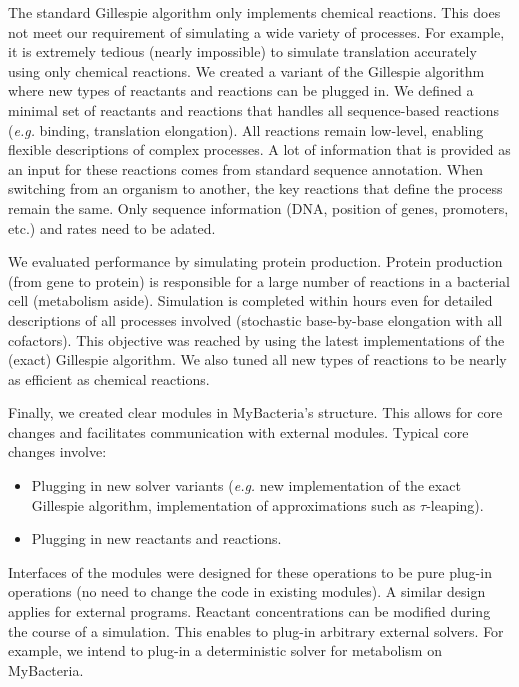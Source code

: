 The standard Gillespie algorithm only implements chemical reactions.
This does not meet our requirement of simulating a wide variety of processes.
For example, it is extremely tedious (nearly impossible) to simulate
translation accurately using only chemical reactions.
We created a variant of the Gillespie algorithm where new types of reactants
and reactions can be plugged in.
We defined a minimal set of reactants and reactions that handles all
sequence-based reactions (\textit{e.g.} binding, translation elongation).
All reactions remain low-level, enabling flexible descriptions of
complex processes.
A lot of information that is provided as an input for these reactions comes from
standard sequence annotation.
When switching from an organism to another, the key reactions that define the
process remain the same.
Only sequence information (DNA, position of genes, promoters, etc.) and rates
need to be adated.

We evaluated performance by simulating protein production.
Protein production (from gene to protein) is responsible for
a large number of reactions in a bacterial cell (metabolism aside).
Simulation is completed within hours even for detailed descriptions of all
processes involved (stochastic base-by-base elongation with all cofactors).
This objective was reached by using the latest implementations
of the (exact) Gillespie algorithm.
We also tuned all new types of reactions to be nearly as efficient as chemical
reactions.

Finally, we created clear modules in MyBacteria's structure.
This allows for core changes and facilitates communication with external modules.
Typical core changes involve:
\begin{itemize}
  \item Plugging in new solver variants
  (\textit{e.g.} new implementation of the  exact Gillespie algorithm,
  implementation of approximations such as $\tau$-leaping).
  \item Plugging in new reactants and reactions.
\end{itemize}
Interfaces of the modules were designed for these operations to be pure
plug-in operations (no need to change the code in existing modules).
A similar design applies for external programs.
Reactant concentrations can be modified during the course of a simulation.
This enables to plug-in arbitrary external solvers.
For example, we intend to plug-in a deterministic solver for metabolism on
MyBacteria.
